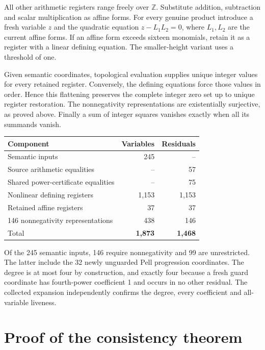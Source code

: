 \documentclass[11pt]{article}
\theoremstyle{definition}
\theoremstyle{remark}
\newcommand{\ZZ}{\mathbb Z}
\begin{document}
All other arithmetic registers range freely over $\ZZ$. Substitute
addition, subtraction and scalar multiplication as affine forms.
For every genuine product introduce a fresh variable $z$ and the
quadratic equation $z-L_1L_2=0$, where $L_1,L_2$ are the current affine
forms. If an affine form exceeds sixteen monomials, retain it as a
register with a linear defining equation. The smaller-height variant
uses a threshold of one.

Given semantic coordinates, topological evaluation supplies unique
integer values for every retained register. Conversely, the defining
equations force those values in order. Hence this flattening preserves
the complete integer zero set up to unique register restoration.
The nonnegativity representations are existentially surjective, as
proved above. Finally a sum of integer squares vanishes exactly when
all its summands vanish.

\begin{center}\small
\begin{tabular}{lrr}
\toprule
Component & Variables & Residuals\\
\midrule
Semantic inputs & 245 & --\\
Source arithmetic equalities & -- & 57\\
Shared power-certificate equalities & -- & 75\\
Nonlinear defining registers & 1,153 & 1,153\\
Retained affine registers & 37 & 37\\
146 nonnegativity representations & 438 & 146\\
\midrule
Total & \textbf{1,873} & \textbf{1,468}\\
\bottomrule
\end{tabular}
\end{center}
Of the 245 semantic inputs, 146 require nonnegativity and 99 are
unrestricted. The latter include the 32 newly unguarded Pell progression
coordinates. The degree is at most four by construction, and exactly
four because a fresh guard coordinate has fourth-power coefficient 1
and occurs in no other residual. The collected expansion independently
confirms the degree, every coefficient and all-variable liveness.

\section{Proof of the consistency theorem}
\end{document}
